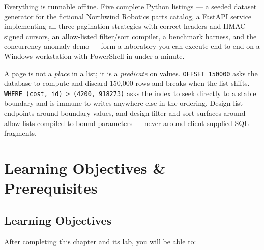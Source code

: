 Everything is runnable offline. Five complete Python listings --- a seeded
dataset generator for the fictional Northwind Robotics parts catalog, a
FastAPI service implementing all three pagination strategies with correct
headers and HMAC-signed cursors, an allow-listed filter/sort compiler, a
benchmark harness, and the concurrency-anomaly demo --- form a laboratory you
can execute end to end on a Windows workstation with PowerShell in under a
minute.

\begin{keyconceptbox}
A page is not a \emph{place} in a list; it is a \emph{predicate} on values.
\texttt{OFFSET 150000} asks the database to compute and discard 150{,}000
rows and breaks when the list shifts. \texttt{WHERE (cost, id) > (4200,
918273)} asks the index to seek directly to a stable boundary and is immune
to writes anywhere else in the ordering. Design list endpoints around
boundary values, and design filter and sort surfaces around allow-lists
compiled to bound parameters --- never around client-supplied SQL fragments.
\end{keyconceptbox}

\section{Learning Objectives \& Prerequisites}
\label{sec:ch8-objectives}

\subsection{Learning Objectives}

After completing this chapter and its lab, you will be able to:

